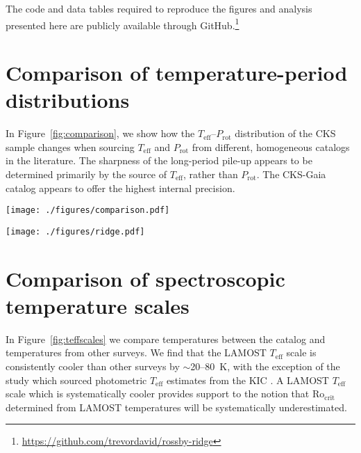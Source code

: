 \documentclass[trackchanges,twocolumn]{aastex631}
\newcommand{\rocrit}{$\mathrm{Ro_{crit}}$\xspace}
\newcommand{\teff}{\ensuremath{T_{\mathrm{eff}}}\xspace}
\newcommand{\prot}{\ensuremath{P_\mathrm{rot}}\xspace}
\begin{document}
The code and data tables required to reproduce the figures and analysis presented here are publicly available through GitHub.\footnote{\url{https://github.com/trevordavid/rossby-ridge}}

\appendix
\section{Comparison of temperature-period distributions}\label{app:teffprot}
In Figure~\ref{fig:comparison}, we show how the \teff--\prot distribution of the CKS sample changes when sourcing \teff and \prot from different, homogeneous catalogs in the literature. The sharpness of the long-period pile-up appears to be determined primarily by the source of \teff, rather than \prot. The CKS-Gaia catalog \citep{Fulton2018} appears to offer the highest internal precision.  


\begin{figure*}
    \centering
    \texttt{[image: ./figures/comparison.pdf]}
    \caption{Comparison of the \teff--\prot distribution for the CKS sample using rotation periods and \teff from the sources indicated by the axes labels.}
    \label{fig:comparison}
\end{figure*}

\begin{figure*}
    \centering
    \texttt{[image: ./figures/ridge.pdf]}
    \caption{The \teff-\prot plane for the CKS sample. Point colors are scaled to the CKS ages determined from isochrone fitting. The source of \prot is denoted above each panel, where \citet{David2021} is a compilation of vetted periods, rather than a source of original measurements. The black trapezoid indicates the approximate area of the ridge. The grey curves indicate empirical cluster sequences from \citet{Curtis2020}, corresponding to ages of $\sim$2.7, 1, 0.67, and 0.12~Gyr from top to bottom.}
    \label{fig:ridge}
\end{figure*}


\section{Comparison of spectroscopic temperature scales}\label{app:teff}

In Figure~\ref{fig:teffscales} we compare temperatures between the  catalog \citep{Xiang2019} and temperatures from other surveys. We find that the LAMOST \teff scale is consistently cooler than other surveys by $\sim$20--80~K, with the exception of the \citet{McQuillan2014} study which sourced photometric \teff estimates from the KIC \citep{Brown2011}. A LAMOST \teff scale which is systematically cooler provides support to the notion that \rocrit determined from LAMOST temperatures will be systematically underestimated. 
\end{document}
